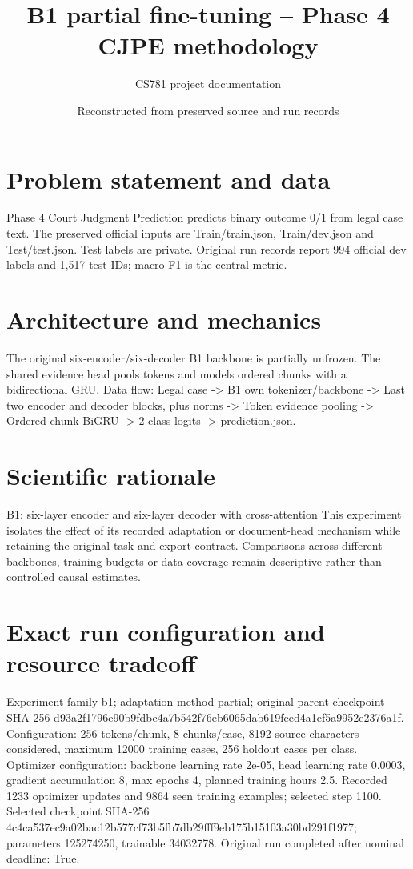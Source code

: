 \documentclass[11pt,a4paper]{article}
\begin{document}
\title{B1 partial fine-tuning -- Phase 4 CJPE methodology}
\author{CS781 project documentation}
\date{Reconstructed from preserved source and run records}
\maketitle
\section{Problem statement and data}
Phase 4 Court Judgment Prediction predicts binary outcome 0/1 from legal case text. The preserved official inputs are Train/train.json, Train/dev.json and Test/test.json. Test labels are private. Original run records report 994 official dev labels and 1,517 test IDs; macro-F1 is the central metric.
\section{Architecture and mechanics}
The original six-encoder/six-decoder B1 backbone is partially unfrozen. The shared evidence head pools tokens and models ordered chunks with a bidirectional GRU. Data flow: Legal case -> B1 own tokenizer/backbone -> Last two encoder and decoder blocks, plus norms -> Token evidence pooling -> Ordered chunk BiGRU -> 2-class logits -> prediction.json.
\section{Scientific rationale}
B1: six-layer encoder and six-layer decoder with cross-attention This experiment isolates the effect of its recorded adaptation or document-head mechanism while retaining the original task and export contract. Comparisons across different backbones, training budgets or data coverage remain descriptive rather than controlled causal estimates.
\section{Exact run configuration and resource tradeoff}
Experiment family b1; adaptation method partial; original parent checkpoint SHA-256 d93a2f1796e90b9fdbe4a7b542f76eb6065dab619feed4a1ef5a9952e2376a1f. Configuration: 256 tokens/chunk, 8 chunks/case, 8192 source characters considered, maximum 12000 training cases, 256 holdout cases per class. Optimizer configuration: backbone learning rate 2e-05, head learning rate 0.0003, gradient accumulation 8, max epochs 4, planned training hours 2.5. Recorded 1233 optimizer updates and 9864 seen training examples; selected step 1100. Selected checkpoint SHA-256 4c4ca537ec9a02bac12b577cf73b5fb7db29fff9eb175b15103a30bd291f1977; parameters 125274250, trainable 34032778. Original run completed after nominal deadline: True.
\end{document}
